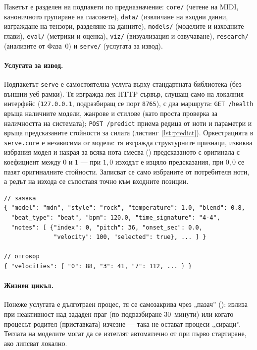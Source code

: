 Пакетът е разделен на подпакети по
предназначение: \texttt{core/} (четене на MIDI, каноничното групиране на
гласовете), \texttt{data/} (извличане на входни данни, изграждане на тензори,
разделяне на данните), \texttt{models/} (моделите и изходните глави),
\texttt{eval/} (метрики и оценка), \texttt{viz/} (визуализация и озвучаване),
\texttt{research/} (анализите от Фаза~0) и \texttt{serve/} (услугата за извод).

\paragraph{Услугата за извод.} Подпакетът \texttt{serve} е самостоятелна услуга
върху стандартната библиотека (без външни уеб рамки). Тя изгражда лек HTTP сървър,
слушащ само на локалния интерфейс (\texttt{127.0.0.1}, подразбиращ се порт
\texttt{8765}), с два маршрута: \texttt{GET /health} връща наличните модели,
жанрове и стилове (като проста проверка за наличността на системата);
\texttt{POST /predict} приема редица от ноти и параметри и връща
предсказаните стойности за силата (листинг~\ref{lst:predict}).
Оркестрацията в \texttt{serve.core} е независима от модела: тя изгражда
структурните признаци, извиква избрания модел и накрая за всяка нота смесва ()
предсказаното с оригинала с коефициент между $0$ и $1$ — при $1{,}0$ изходът е
изцяло предсказания, при $0{,}0$ се пазят оригиналните стойности. Записват се само
избраните от потребителя ноти, а редът на изхода се съпоставя точно към входните
позиции.

\renewcommand{\lstlistingname}{Листинг}
\begin{lstlisting}[caption={Заявка и отговор на \texttt{POST /predict} (съкратено).},label={lst:predict}]
// заявка
{ "model": "mdn", "style": "rock", "temperature": 1.0, "blend": 0.8,
  "beat_type": "beat", "bpm": 120.0, "time_signature": "4-4",
  "notes": [ {"index": 0, "pitch": 36, "onset_sec": 0.0,
              "velocity": 100, "selected": true}, ... ] }

// отговор
{ "velocities": { "0": 88, "3": 41, "7": 112, ... } }
\end{lstlisting}

\paragraph{Жизнен цикъл.} Понеже услугата е дълготраен процес, тя се самозакрива
чрез „пазач'' (): излиза при неактивност над зададен праг (по
подразбиране 30~минути) или когато процесът родител (приставката) изчезне — така не
остават процеси ,,сираци''. Теглата на моделите могат да се изтеглят автоматично от
 при първо стартиране, ако липсват локално.

